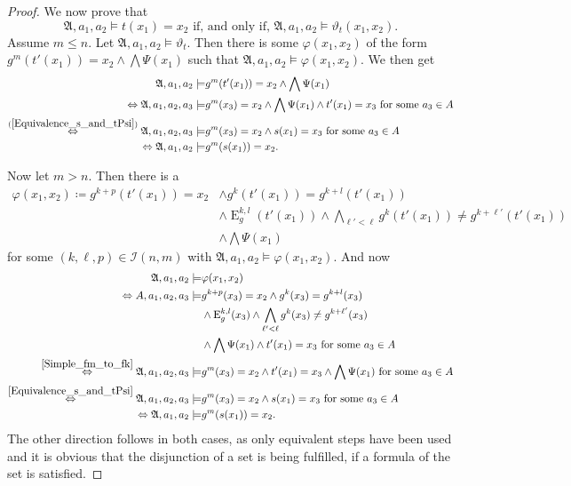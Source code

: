 \documentclass[a4paper,11pt,DIV=15]{scrartcl} %
\renewcommand{\phi}{\varphi}
\theoremstyle{plain}
\theoremstyle{definition}
\renewcommand{\theta}{\vartheta}
\begin{document}
\begin{proof}
	We now prove that 
	$$\mathfrak A, a_1,a_2\models t(x_1)=x_2 \text{ if, and only if, } \mathfrak A,a_1,a_2\models \theta_{t}(x_1,x_2).$$
	Assume $m\leq n$.
	Let $\mathfrak A, a_1,a_2 \models \theta_{t}$.
	Then there is some $\phi(x_1,x_2)$ of the form $g^{m}(t'(x_1))=x_2 \land \bigwedge \Psi(x_1)$ such that $\mathfrak A,a_1,a_2\models \phi(x_1,x_2)$.
	We then get
	\begin{align*}
		\mathfrak A,a_1,a_2 \models & g^{m}(t'(x_1))=x_2 \land \bigwedge \Psi(x_1) \\
		\Leftrightarrow \mathfrak A,a_1,a_2,a_3 \models & g^{m}(x_3)=x_2 \land \bigwedge \Psi(x_1) \land t'(x_1)=x_3 \text{ for some } a_3\in A \\
		\overset{(\ref{Equivalence_s_and_tPsi})}{\Leftrightarrow} \mathfrak A,a_1,a_2,a_3\models & g^{m}(x_3)=x_2 \land s(x_1)=x_3 \text{ for some } a_3\in A \\
		\Leftrightarrow \mathfrak A,a_1,a_2 \models & g^{m}(s(x_1))=x_2.
	\end{align*}
	
	Now let $m>n$.
	Then there is a
	\begin{align*}
		\phi(x_1,x_2)\coloneqq g^{k+p}(t'(x_1))=x_2 &\land g^{k}(t'(x_1))=g^{k+l}(t'(x_1)) \\
		& \land \operatorname{E}^{k,l}_g(t'(x_1)) \land \bigwedge_{\ell'<\ell} g^{k}(t'(x_1))\neq g^{k+\ell'}(t'(x_1)) \\
		& \land \bigwedge \Psi(x_1)
	\end{align*}
	for some $(k,\ell,p)\in\mathcal I(n,m)$ with $\mathfrak A,a_1,a_2\models \phi(x_1,x_2)$.
	And now
	\begin{align*}
		\mathfrak A,a_1,a_2 \models & \phi(x_1,x_2) \\
		\Leftrightarrow A,a_1,a_2,a_3 \models &g^{k+p}(x_3)=x_2 \land g^{k}(x_3)=g^{k+l}(x_3) \\
			& \land \operatorname{E}^{k,l}_g(x_3) \land \bigwedge_{\ell'<\ell} g^{k}(x_3)\neq g^{k+\ell'}(x_3) \\
			& \land \bigwedge\Psi(x_1) \land t'(x_1)=x_3 \text{ for some } a_3\in A \\
		\overset{\cref{Simple_fm_to_fk}}{\Leftrightarrow} \mathfrak A, a_1,a_2,a_3 \models & g^{m}(x_3)=x_2 \land t'(x_1)=x_3 \land \bigwedge\Psi(x_1) \text{ for some } a_3 \in A \\
		\overset{\cref{Equivalence_s_and_tPsi}}{\Leftrightarrow} \mathfrak A,a_1,a_2,a_3 \models & g^{m}(x_3)=x_2\land s(x_1)=x_3 \text{ for some } a_3\in A \\
		\Leftrightarrow \mathfrak A,a_1,a_2 \models & g^{m}(s(x_1))=x_2.
	\end{align*}
	The other direction follows in both cases, as only equivalent steps have been used and it is obvious that the disjunction of a set is being fulfilled, if a formula of the set is satisfied.
	

\end{proof}
\end{document}
